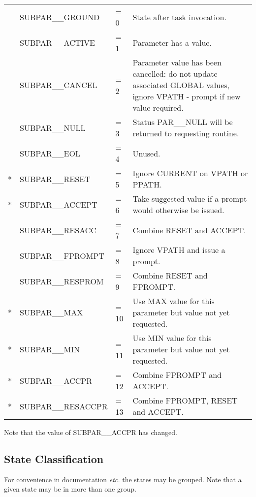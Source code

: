\begin{tabular}{cllp{3.5in}}
& SUBPAR\_\_GROUND &= 0  &State after task invocation.\\
& SUBPAR\_\_ACTIVE &= 1  &Parameter has a value.\\
& SUBPAR\_\_CANCEL &= 2  &Parameter value has been cancelled:
do not update associated GLOBAL values,
ignore VPATH - prompt if new value required.\\
& SUBPAR\_\_NULL   &= 3  &Status PAR\_\_NULL will be returned to requesting
routine.\\
& SUBPAR\_\_EOL    &= 4  &Unused.\\
{*} &SUBPAR\_\_RESET  &= 5  &Ignore CURRENT on VPATH or PPATH.\\
{*} &SUBPAR\_\_ACCEPT &= 6  &Take suggested value if a prompt would otherwise 
be issued.\\
& SUBPAR\_\_RESACC &= 7  &Combine RESET and ACCEPT.\\
& SUBPAR\_\_FPROMPT &= 8 &Ignore VPATH and issue a prompt.\\
& SUBPAR\_\_RESPROM &= 9 & Combine RESET and FPROMPT.\\
{*} &SUBPAR\_\_MAX    &= 10 &Use MAX value for this parameter but value not 
yet requested.\\
{*} &SUBPAR\_\_MIN    &= 11  & Use MIN value for this parameter but value
not yet requested.\\
{*} &SUBPAR\_\_ACCPR  &= 12  &Combine FPROMPT and ACCEPT.\\
{*} &SUBPAR\_\_RESACCPR &= 13  &Combine FPROMPT, RESET and ACCEPT.\\
\end{tabular}

Note that the value of SUBPAR\_\_ACCPR has changed.


\subsection{State Classification}
For convenience in documentation {\em etc.} the states may be grouped. 
Note that a given state may be in more than one group.

